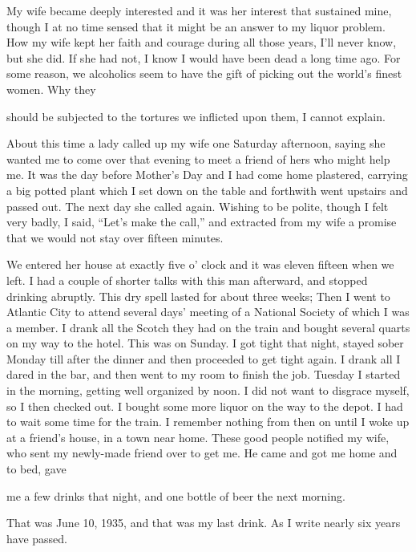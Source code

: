 \begin{biblechapter}
My wife became deeply interested and it was her interest that sustained mine, though I at no time sensed that it might be an answer to my liquor problem. How my wife kept her faith and courage during all those years, I’ll never know, but she did. If she had not, I know I would have been dead a long time ago. For some reason, we alcoholics seem to have the gift of picking out the world’s finest women. Why they

should be subjected to the tortures we inflicted upon them, I cannot explain.

About this time a lady called up my wife one Saturday afternoon, saying she wanted me to come over that evening to meet a friend of hers who might help me. It was the day before Mother’s Day and I had come home plastered, carrying a big potted plant which I set down on the table and forthwith went upstairs and passed out. The next day she called again. Wishing to be polite, though I felt very badly, I said, “Let’s make the call,” and extracted from my wife a promise that we would not stay over fifteen minutes.

We entered her house at exactly five o’ clock and it was eleven fifteen when we left. I had a couple of shorter talks with this man afterward, and stopped drinking abruptly. This dry spell lasted for about three weeks; Then I went to Atlantic City to attend several days’ meeting of a National Society of which I was a member. I drank all the Scotch they had on the train and bought several quarts on my way to the hotel. This was on Sunday. I got tight that night, stayed sober Monday till after the dinner and then proceeded to get tight again. I drank all I dared in the bar, and then went to my room to finish the job. Tuesday I started in the morning, getting well organized by noon. I did not want to disgrace myself, so I then checked out. I bought some more liquor on the way to the depot. I had to wait some time for the train. I remember nothing from then on until I woke up at a friend’s house, in a town near home. These good people notified my wife, who sent my newly-made friend over to get me. He came and got me home and to bed, gave

me a few drinks that night, and one bottle of beer the next morning.

That was June 10, 1935, and that was my last drink. As I write nearly six years have passed.


\end{biblechapter}
